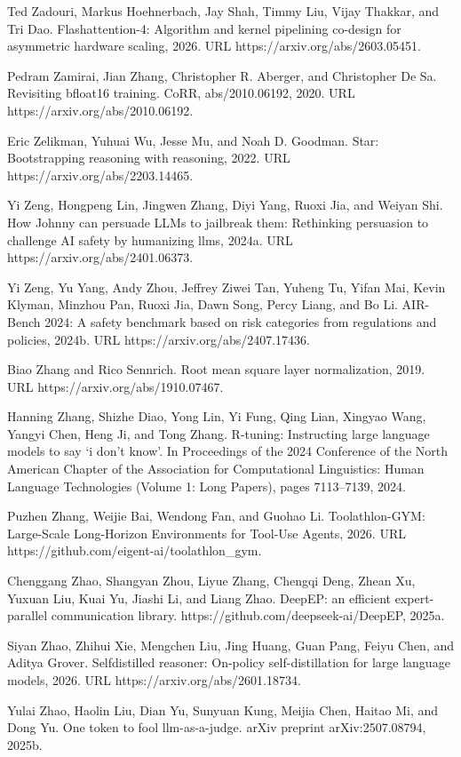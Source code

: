 Ted Zadouri, Markus Hoehnerbach, Jay Shah, Timmy Liu, Vijay Thakkar, and
Tri Dao. Flashattention-4: Algorithm and kernel pipelining co-design for
asymmetric hardware scaling, 2026. URL https://arxiv.org/abs/2603.05451.

Pedram Zamirai, Jian Zhang, Christopher R. Aberger, and Christopher De
Sa. Revisiting bfloat16 training. CoRR, abs/2010.06192, 2020. URL
https://arxiv.org/abs/2010.06192.

Eric Zelikman, Yuhuai Wu, Jesse Mu, and Noah D. Goodman. Star:
Bootstrapping reasoning with reasoning, 2022. URL
https://arxiv.org/abs/2203.14465.

Yi Zeng, Hongpeng Lin, Jingwen Zhang, Diyi Yang, Ruoxi Jia, and Weiyan
Shi. How Johnny can persuade LLMs to jailbreak them: Rethinking
persuasion to challenge AI safety by humanizing llms, 2024a. URL
https://arxiv.org/abs/2401.06373.

Yi Zeng, Yu Yang, Andy Zhou, Jeffrey Ziwei Tan, Yuheng Tu, Yifan Mai,
Kevin Klyman, Minzhou Pan, Ruoxi Jia, Dawn Song, Percy Liang, and Bo Li.
AIR-Bench 2024: A safety benchmark based on risk categories from
regulations and policies, 2024b. URL https://arxiv.org/abs/2407.17436.

Biao Zhang and Rico Sennrich. Root mean square layer normalization,
2019. URL https://arxiv.org/abs/1910.07467.

Hanning Zhang, Shizhe Diao, Yong Lin, Yi Fung, Qing Lian, Xingyao Wang,
Yangyi Chen, Heng Ji, and Tong Zhang. R-tuning: Instructing large
language models to say `i don't know'. In Proceedings of the 2024
Conference of the North American Chapter of the Association for
Computational Linguistics: Human Language Technologies (Volume 1: Long
Papers), pages 7113--7139, 2024.

Puzhen Zhang, Weijie Bai, Wendong Fan, and Guohao Li. Toolathlon-GYM:
Large-Scale Long-Horizon Environments for Tool-Use Agents, 2026. URL
https://github.com/eigent-ai/toolathlon\_gym.

Chenggang Zhao, Shangyan Zhou, Liyue Zhang, Chengqi Deng, Zhean Xu,
Yuxuan Liu, Kuai Yu, Jiashi Li, and Liang Zhao. DeepEP: an efficient
expert-parallel communication library. https://github.com/deepseek-ai/DeepEP, 2025a.

Siyan Zhao, Zhihui Xie, Mengchen Liu, Jing Huang, Guan Pang, Feiyu Chen,
and Aditya Grover. Selfdistilled reasoner: On-policy self-distillation
for large language models, 2026. URL https://arxiv.org/abs/2601.18734.

Yulai Zhao, Haolin Liu, Dian Yu, Sunyuan Kung, Meijia Chen, Haitao Mi,
and Dong Yu. One token to fool llm-as-a-judge. arXiv preprint
arXiv:2507.08794, 2025b.

